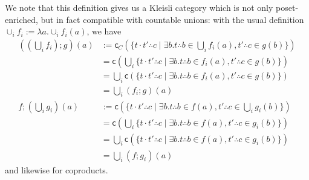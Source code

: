 \documentclass[acmsmall,screen,review]{acmart}
\newcommand{\ms}[1]{\ensuremath{\mathsf{#1}}}
\newcommand{\tret}[2]{#1 \therefore #2}
\begin{document}
We note that this definition gives us a Kleisli category which is not only poset-enriched, but in
fact compatible with countable unions: with the usual definition $\cup_i f_i := \lambda a . \cup_i
f_i(a)$, we have
\begin{align*}
  ((\bigcup_i f_i) ; g)(a) &:= \ms{c}_C(\{
    \tret{t \cdot t'}{c} \mid \exists b . \tret{t}{b} \in \bigcup_i f_i(a), \tret{t'}{c} \in g(b)
  \}) \\
  &= \ms{c}(\bigcup_i \{
      \tret{t \cdot t'}{c} \mid \exists b . \tret{t}{b} \in f_i(a), \tret{t'}{c} \in g(b)
    \}) \\
  &= \bigcup_i \ms{c}(\{
      \tret{t \cdot t'}{c} \mid \exists b . \tret{t}{b} \in f_i(a), \tret{t'}{c} \in g(b)
    \}) \\
  &= \bigcup_i (f_i ; g)(a)
  \\
  f ; (\bigcup_i g_i)(a) &:= \ms{c}(\{
    \tret{t \cdot t'}{c} \mid \exists b . \tret{t}{b} \in f(a), \tret{t'}{c} \in \bigcup_i g_i(b)
  \}) \\
  &= \ms{c}(\bigcup_i \{
    \tret{t \cdot t'}{c} \mid \exists b . \tret{t}{b} \in f(a), \tret{t'}{c} \in g_i(b)
  \}) \\
  &= \bigcup_i \ms{c}(\{
    \tret{t \cdot t'}{c} \mid \exists b . \tret{t}{b} \in f(a), \tret{t'}{c} \in g_i(b)
  \}) \\
  &= \bigcup_i (f ; g_i)(a)
\end{align*}
and likewise for coproducts.
\end{document}
